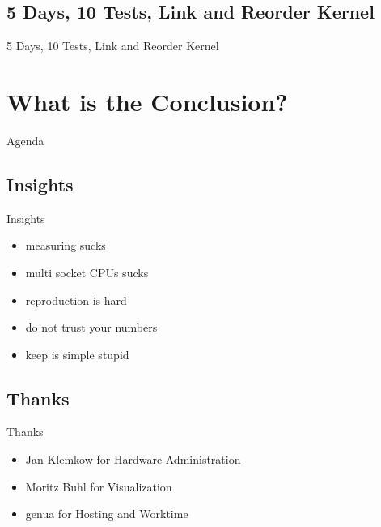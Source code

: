 \documentclass[14pt,aspectratio=169]{beamer}
\begin{document}
\subsection{5 Days, 10 Tests, Link and Reorder Kernel}
\begin{frame}{5 Days, 10 Tests, Link and Reorder Kernel}
    \begin{adjustbox}{totalheight=\baselineskip}
	
    \end{adjustbox}
\end{frame}

\section{What is the Conclusion?}

\begin{frame}{Agenda}
\setcounter{tocdepth}{1}
\tableofcontents[currentsection]
\end{frame}

\subsection{Insights}
\begin{frame}{Insights}
\begin{itemize}
    \item measuring sucks
    \item multi socket CPUs sucks
    \item reproduction is hard
    \item do not trust your numbers
    \item keep is simple stupid
\end{itemize}
\end{frame}

\subsection{Thanks}
\begin{frame}{Thanks}
\begin{itemize}
    \item Jan Klemkow for Hardware Administration
    \item Moritz Buhl for Visualization
    \item genua for Hosting and Worktime
\end{itemize}
\end{frame}
\end{document}
